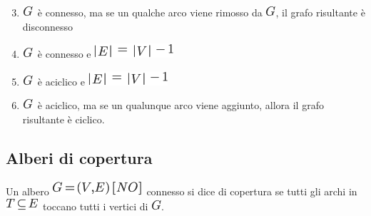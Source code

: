 \documentclass{article}
\providecommand{\tightlist}{%
  \setlength{\itemsep}{0pt}\setlength{\parskip}{0pt}}
\begin{document}
\begin{enumerate}
\setcounter{enumi}{2}
\tightlist
\item
  \includegraphics{images/image340.png}{~è connesso, ma se un qualche
  arco viene rimosso da }\includegraphics{images/image340.png}{, il
  grafo risultante è disconnesso}
\item
  \includegraphics{images/image340.png}{~è connesso e
  }\includegraphics{images/image375.png}
\item
  \includegraphics{images/image340.png}{~è aciclico e
  }\includegraphics{images/image375.png}
\item
  \includegraphics{images/image340.png}{~è aciclico, ma se un qualunque
  arco viene aggiunto, allora il grafo risultante è ciclico.}
\end{enumerate}

{}

\hypertarget{h.9btor4ygb1hb}{\subsection{\texorpdfstring{{Alberi di
copertura}}{Alberi di copertura}}\label{h.9btor4ygb1hb}}

{Un albero }\includegraphics{images/image420.png}{~connesso si dice di
copertura se tutti gli archi in
}\includegraphics{images/image443.png}{~toccano tutti i vertici di
}\includegraphics{images/image340.png}{.}
\end{document}
